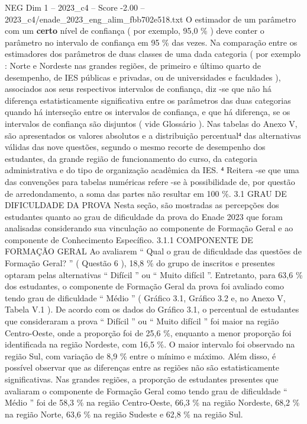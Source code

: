 \begin{textsample}{NEG Dim 1 – 2023\_c4 – Score -2.00 – 2023\_c4/enade\_2023\_eng\_alim\_fbb702e518.txt}
O estimador de um parâmetro com um \textbf{certo} nível de confiança ( por exemplo, 95,0 \% ) deve conter o parâmetro no intervalo de confiança em 95 \% das vezes.
Na comparação entre os estimadores dos parâmetros de duas classes de uma dada categoria ( por exemplo : Norte e Nordeste nas grandes regiões, de primeiro e último quarto de desempenho, de IES públicas e privadas, ou de universidades e faculdades ), associados aos seus respectivos intervalos de confiança, diz -se que não há diferença estatisticamente significativa entre os parâmetros das duas categorias quando há interseção entre os intervalos de confiança, e que há diferença, se os intervalos de confiança são disjuntos ( vide Glossário ).
Nas tabelas do Anexo V, são apresentados os valores absolutos e a distribuição percentual⁴ das alternativas válidas das nove questões, segundo o mesmo recorte de desempenho dos estudantes, da grande região de funcionamento do curso, da categoria administrativa e do tipo de organização acadêmica da IES. ⁴ Reitera -se que uma das convenções para tabelas numéricas refere -se à possibilidade de, por questão de arredondamento, a soma das partes não resultar em 100 \%. 3.1 GRAU DE DIFICULDADE DA PROVA Nesta seção, são mostradas as percepções dos estudantes quanto ao grau de dificuldade da prova do Enade 2023 que foram analisadas considerando sua vinculação ao componente de Formação Geral e ao componente de Conhecimento Específico. 3.1.1 COMPONENTE DE FORMAÇÃO GERAL Ao avaliarem “ Qual o grau de dificuldade das questões de Formação Geral? ” ( Questão 6 ), 18,8 \% do grupo de inscritos e presentes optaram pelas alternativas “ Difícil ” ou “ Muito difícil ”.
Entretanto, para 63,6 \% dos estudantes, o componente de Formação Geral da prova foi avaliado como tendo grau de dificuldade “ Médio ” ( Gráfico 3.1, Gráfico 3.2 e, no Anexo V, Tabela V.1 ).
De acordo com os dados do Gráfico 3.1, o percentual de estudantes que consideraram a prova “ Difícil ” ou “ Muito difícil ” foi maior na região Centro-Oeste, onde a proporção foi de 25,6 \%, enquanto a menor proporção foi identificada na região Nordeste, com 16,5 \%.
O maior intervalo foi observado na região Sul, com variação de 8,9 \% entre o mínimo e máximo.
Além disso, é possível observar que as diferenças entre as regiões não são estatisticamente significativas.
Nas grandes regiões, a proporção de estudantes presentes que avaliaram o componente de Formação Geral como tendo grau de dificuldade “ Médio ” foi de 58,3 \% na região Centro-Oeste, 66,3 \% na região Nordeste, 68,2 \% na região Norte, 63,6 \% na região Sudeste e 62,8 \% na região Sul.

\end{textsample}
